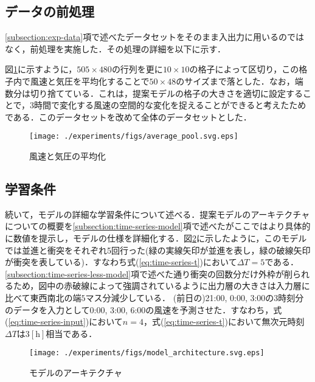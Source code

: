 
\subsection{データの前処理 \label{subsection:exp-data-preprocessing}}
\ref{subsection:exp-data}項で述べたデータセットをそのまま入出力に用いるのではなく，前処理を実施した．その処理の詳細を以下に示す．

図\ref{fig:exp-averaging}に示すように，$505 \times 480$の行列を更に$10 \times 10$の格子によって区切り，この格子内で風速と気圧を平均化することで$50 \times 48$のサイズまで落とした．なお，端数分は切り捨てている．これは，提案モデルの格子の大きさを適切に設定することで，3時間で変化する風速の空間的な変化を捉えることができると考えたためである．このデータセットを改めて全体のデータセットとした．%

\begin{figure}[bp]
  \centering
  \texttt{[image: ./experiments/figs/average\_pool.svg.eps]}
  \caption{風速と気圧の平均化}
  \label{fig:exp-averaging}
\end{figure}

\subsection{学習条件 \label{subsection:exp-condition}}

続いて，モデルの詳細な学習条件について述べる．提案モデルのアーキテクチャについての概要を\ref{subsection:time-series-model}項で述べたがここではより具体的に数値を提示し，モデルの仕様を詳細化する．図\ref{fig:exp-model-architecture}に示したように，このモデルでは並進と衝突をそれぞれ5回行った(緑の実線矢印が並進を表し，緑の破線矢印が衝突を表している)．すなわち式(\ref{eq:time-series-t})において$\Delta T = 5$である．\ref{subsection:time-series-less-model}項で述べた通り衝突の回数分だけ外枠が削られるため，図中の赤破線によって強調されているように出力層の大きさは入力層に比べて東西南北の端$5$マス分減少している．
(前日の)21:00, 0:00, 3:00の3時刻分のデータを入力として0:00, 3:00, 6:00の風速を予測させた．すなわち，式(\ref{eq:time-series-input})において$n=4$，式(\ref{eq:time-series-t})において無次元時刻$\Delta T$は$3[\mathrm{h}]$相当である．

\begin{figure}[bp]
  \centering
  \texttt{[image: ./experiments/figs/model\_architecture.svg.eps]}
  \caption{モデルのアーキテクチャ}
  \label{fig:exp-model-architecture}
\end{figure}

